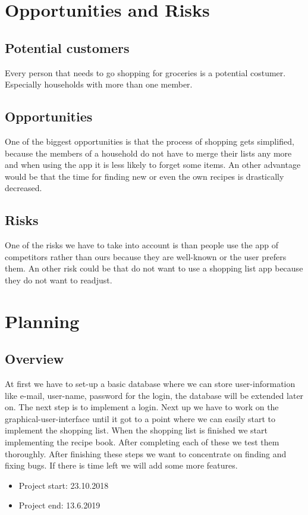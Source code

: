 \documentclass[12pt]{article}
\theoremstyle{definition}
\begin{document}
\pagebreak

\section{Opportunities and Risks}
\subsection{Potential customers}
Every person that needs to go shopping for groceries is a potential costumer.
Especially households with more than one member.

\subsection{Opportunities}
One of the biggest opportunities is that the process of shopping gets simplified, because the members of a household do not have to merge their lists any more and when using the app it is less likely to forget some items. An other advantage would be that the time for finding new or even the own recipes is drastically decreased.

\subsection{Risks}
One of the risks we have to take into account is than people use the app of competitors rather than ours because they are well-known or the user prefers them. An other risk could be that do not want to use a shopping list app because they do not want to readjust.

\pagebreak

\section{Planning}
\subsection{Overview}
At first we have to set-up a basic database where we can store user-information like e-mail, user-name, password for the login, the database will be extended later on. The next step is to implement a login. Next up we have to work on the graphical-user-interface until it got to a point where we can easily start to implement the shopping list. When the shopping list is finished we start implementing the recipe book. After completing each of these we test them thoroughly. After finishing these steps we want to concentrate on finding and fixing bugs. If there is time left we will add some more features.
\begin{itemize}
\item Project start: 23.10.2018
\item Project end: 13.6.2019
\end{itemize}
\end{document}
